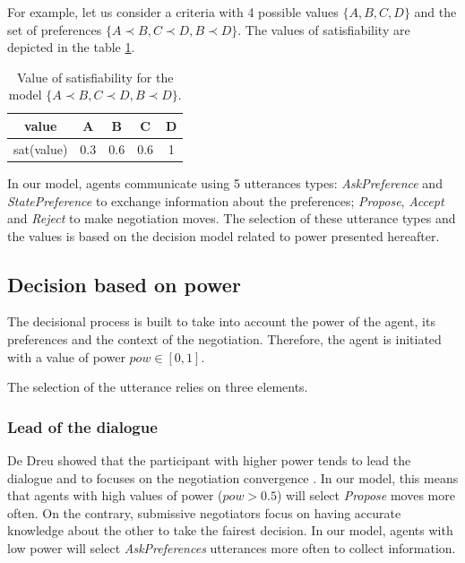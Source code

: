 \documentclass[sigconf]{aamas}  %
\begin{document}
	\par For example, let us consider a criteria with 4 possible values $\{A, B, C, D\}$ and the set of preferences $\{A \prec B, C \prec D , B \prec D \}$. The values of satisfiability are depicted in the table \ref{tab:sat}.
		\begin{table}
			\centering
			\begin{tabular}{ |c|c|c|c|c| }
				\hline				
				value & A & B & C & D \\
				\hline
				
				\hline
				sat(value) & 0.3 & 0.6 & 0.6 & 1 \\
				\hline
				
			\end{tabular}
			\caption{Value of satisfiability for the model $\{A \prec B, C \prec D , B \prec D \}$.}
			\label{tab:sat}
		\end{table}
	
	\par
	In our model, agents communicate using 5 utterances types: \emph{AskPreference} and \emph{StatePreference} to exchange information about the preferences; \emph{Propose}, \emph{Accept} and \emph{Reject} to make negotiation moves. The selection of these utterance types and the values is based on the decision model related to power presented hereafter.
	
	\subsection{Decision based on power}
	
	The decisional process is built to take into account the power of the agent, its preferences and the context of the negotiation. Therefore, the agent is initiated with a value of power $pow \in [0,1]$. 
	
	The selection of the utterance relies on three elements.
	
	\subsubsection{Lead of the dialogue}
	De Dreu showed that the participant with higher power tends to lead the dialogue and to focuses on the negotiation convergence \cite{magee2007power,de2004influence}. In our model, this means that agents with high values of power ($pow>0.5$) will select \emph{Propose} moves more often. On the contrary, submissive negotiators focus on having accurate knowledge about the other to take the fairest decision. In our model, agents with low power will select \emph{AskPreferences} utterances more often to collect information.
		
\end{document}
